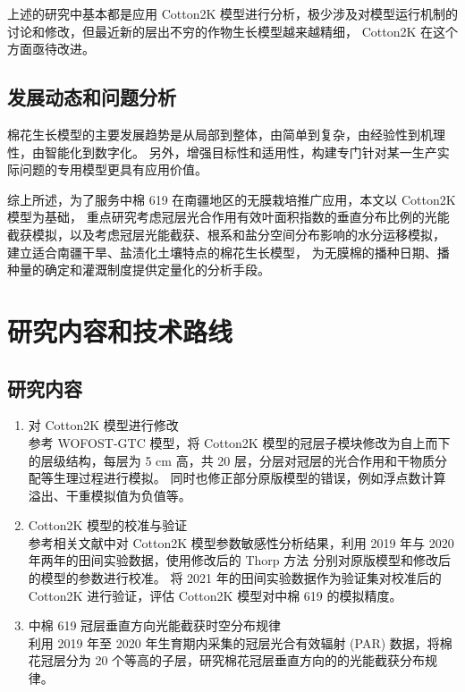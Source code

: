 上述的研究中基本都是应用 Cotton2K 模型进行分析，极少涉及对模型运行机制的讨论和修改，但最近新的层出不穷的作物生长模型越来越精细，%
Cotton2K 在这个方面亟待改进。

\subsection{发展动态和问题分析}
棉花生长模型的主要发展趋势是从局部到整体，由简单到复杂，由经验性到机理性，由智能化到数字化。%
另外，增强目标性和适用性，构建专门针对某一生产实际问题的专用模型更具有应用价值\cite{thorp2014}。

综上所述，为了服务中棉 619 在南疆地区的无膜栽培推广应用，本文以 Cotton2K 模型为基础，%
重点研究考虑冠层光合作用有效叶面积指数的垂直分布比例的光能截获模拟，以及考虑冠层光能截获、根系和盐分空间分布影响的水分运移模拟，%
建立适合南疆干旱、盐渍化土壤特点的棉花生长模型，
为无膜棉的播种日期、播种量的确定和灌溉制度提供定量化的分析手段。

\section{研究内容和技术路线}

\subsection{研究内容}
\begin{enumerate}[label=（\arabic*）]
    \item 对 Cotton2K 模型进行修改\\%
          参考 WOFOST-GTC 模型，将 Cotton2K 模型的冠层子模块修改为自上而下的层级结构，每层为 5 cm 高，共 20 层，分层对冠层的光合作用和干物质分配等生理过程进行模拟。%
          同时也修正部分原版模型的错误，例如浮点数计算溢出、干重模拟值为负值等。
    \item Cotton2K 模型的校准与验证\\%
          参考相关文献中对 Cotton2K 模型参数敏感性分析结果，利用 2019 年与 2020 年两年的田间实验数据，使用修改后的 Thorp 方法\cite{thorp2019} 分别对原版模型和修改后的模型的参数进行校准。%
          将 2021 年的田间实验数据作为验证集对校准后的 Cotton2K 进行验证，评估 Cotton2K 模型对中棉 619 的模拟精度。
    \item 中棉 619 冠层垂直方向光能截获时空分布规律\\%
          利用 2019 年至 2020 年生育期内采集的冠层光合有效辐射 (PAR) 数据，将棉花冠层分为 20 个等高的子层，研究棉花冠层垂直方向的的光能截获分布规律。
\end{enumerate}

